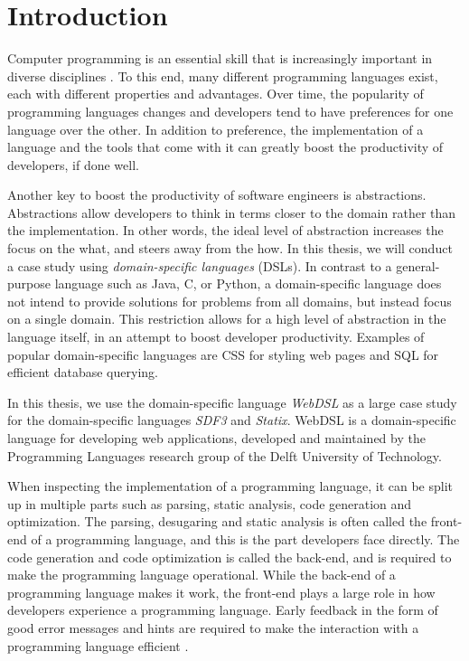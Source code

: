 
\chapter{\label{chap:introduction}Introduction}

  Computer programming is an essential skill that is increasingly important in diverse disciplines \autocite{Rafalski2019}. To this end, many different programming languages exist, each with different properties and advantages. Over time, the popularity of programming languages changes and developers tend to have preferences for one language over the other. In addition to preference, the implementation of a language and the tools that come with it can greatly boost the productivity of developers, if done well.

  Another key to boost the productivity of software engineers is abstractions. Abstractions allow developers to think in terms closer to the domain rather than the implementation. In other words, the ideal level of abstraction increases the focus on the what, and steers away from the how. In this thesis, we will conduct a case study using \textit{domain-specific languages} (DSLs). In contrast to a general-purpose language such as Java, C, or Python, a domain-specific language does not intend to provide solutions for problems from all domains, but instead focus on a single domain. This restriction allows for a high level of abstraction in the language itself, in an attempt to boost developer productivity. Examples of popular domain-specific languages are CSS for styling web pages and SQL for efficient database querying.

  In this thesis, we use the domain-specific language \textit{WebDSL} as a large case study for the domain-specific languages \textit{SDF3} and \textit{Statix}. WebDSL is a domain-specific language for developing web applications, developed and maintained by the Programming Languages research group of the Delft University of Technology.

  When inspecting the implementation of a programming language, it can be split up in multiple parts such as parsing, static analysis, code generation and optimization. The parsing, desugaring and static analysis is often called the front-end of a programming language, and this is the part developers face directly. The code generation and code optimization is called the back-end, and is required to make the programming language operational. While the back-end of a programming language makes it work, the front-end plays a large role in how developers experience a programming language. Early feedback in the form of good error messages and hints are required to make the interaction with a programming language efficient \autocite{Becker2019}.

